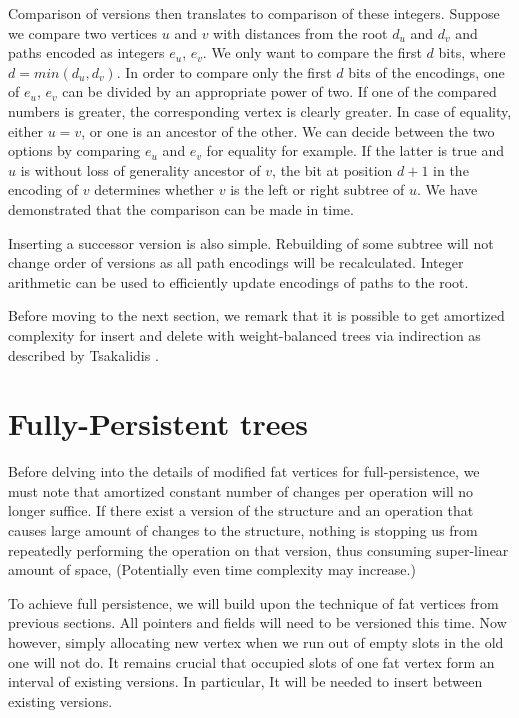 Comparison of versions then translates to comparison of these integers.
Suppose we compare two vertices $u$ and $v$ with distances from the root $d_u$ and $d_v$ and paths encoded as integers $e_u$, $e_v$. 
We only want to compare the first $d$ bits, where $d = min(d_u,d_v)$. 
In order to compare only the first $d$ bits of the encodings, one of $e_u$, $e_v$ can be divided by an appropriate power of two. 
If one of the compared numbers is greater, the corresponding vertex is clearly greater. 
In case of equality, either $u = v$, or one is an ancestor of the other. We can decide between the two options by comparing $e_u$ and $e_v$ for equality for example. 
If the latter is true and $u$ is without loss of generality ancestor of $v$, the bit at position $d+1$ in the encoding of $v$ determines whether $v$ is the left or right subtree of $u$. 
We have demonstrated that the comparison can be made in  time. 

Inserting a successor version is also simple. Rebuilding of some subtree will not change order of versions as all path encodings will be recalculated. Integer arithmetic can be used to efficiently update encodings of paths to the root.

Before moving to the next section, we remark that it is possible to get  amortized complexity for insert and delete with weight-balanced trees via indirection as described by Tsakalidis \cite{list-ordering}.

\section{Fully-Persistent trees}

Before delving into the details of modified fat vertices for full-persistence, we must note that amortized constant number of changes per operation will no longer suffice. If there exist a version of the structure and an operation that causes large amount of changes to the structure, nothing is stopping us from repeatedly performing the operation on that version, thus consuming super-linear amount of space, (Potentially even time complexity may increase.)

To achieve full persistence, we will build upon the technique of fat vertices from previous sections. All pointers and fields will need to be versioned this time. Now however, simply allocating new vertex when we run out of empty slots in the old one will not do. It remains crucial that occupied slots of one fat vertex form an interval of existing versions. In particular, It will be needed to insert between existing versions.

